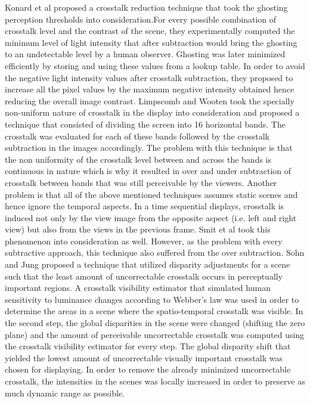  Konard et al \cite{konrad2000cancellation} proposed a crosstalk reduction technique that took the ghosting perception thresholds into consideration.For every possible combination of crosstalk level and the contrast of the scene, they experimentally computed the minimum level of light intensity that after subtraction would bring the ghosting to an undetectable level by a human observer. Ghosting was later minimized efficiently by storing and using these values from a lookup table. In order to avoid the negative light intensity values after crosstalk subtraction, they proposed to increase all the pixel values by the maximum negative intensity obtained hence reducing the overall image contrast. Limpscomb and Wooten \cite{lipscomb1994reducing} took the specially non-uniform nature of crosstalk in the display into consideration and proposed a technique that consisted of dividing the screen into 16 horizontal bands. The crosstalk was evaluated for each of these bands followed by the crosstalk subtraction in the images accordingly. The problem with this technique is that the non uniformity of the crosstalk level between and across the bands is continuous in nature which is why it resulted in over and under subtraction of crosstalk between bands that was still perceivable by the viewers. Another problem is that all of the above mentioned techniques assumes static scenes and hence ignore the temporal aspects. In a time sequential displays, crosstalk is induced not only by the view image from the opposite aspect (i.e. left and right view) but also from the views in the previous frame. Smit et al \cite{smit2007non} took this phenomenon into consideration as well. However, as the problem with every subtractive approach, this technique also suffered from the over subtraction. Sohn and Jung \cite{sohn2014crosstalk} proposed a technique that utilized disparity adjustments for a scene such that the least amount of uncorrectable crosstalk occurs in perceptually important regions. A crosstalk visibility estimator that simulated human sensitivity to luminance changes according to Webber's law was used in order to determine the areas in a scene where the spatio-temporal crosstalk was visible. In the second step, the global disparities in the scene were changed (shifting the zero plane) and the amount of perceivable uncorrectable crosstalk was computed using the crosstalk visibility estimator for every step. The global disparity shift that yielded the lowest amount of uncorrectable visually important crosstalk was chosen for displaying. In order to remove the already minimized uncorrectable crosstalk, the intensities in the scenes was locally increased in order to preserve as much dynamic range as possible.

